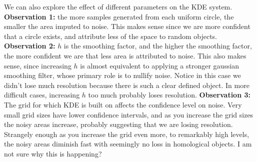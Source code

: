 \documentclass[a4paper]{article}
\begin{document}
We can also explore the effect of different parameters on the KDE system. \textbf{Observation 1:} the more samples generated from each uniform circle, the smaller the area imputed to noise. This makes sense since we are more confident that a circle exists, and attribute less of the space to random objects. \textbf{Observation 2:} $h$ is the smoothing factor, and the higher the smoothing factor, the more confident we are that less area is attributed to noise. This also makes sense, since increasing $h$ is almost equivalent to applying a stronger gaussian smoothing filter, whose primary role is to nullify noise. Notice in this case we didn't lose much resolution because there is such a clear defined object. In more difficult cases, increasing $h$ too much probably loses resolution. \textbf{Observation 3:} The grid for which KDE is built on affects the confidence level on noise. Very small grid sizes have lower confidence intervals, and as you increase the grid sizes the noisy areas increase, probably suggesting that we are losing resolution. Strangely enough as you increase the grid even more, to remarkably high levels, the noisy areas diminish fast with seemingly no loss in homological objects. I am not sure why this is happening?
\end{document}
